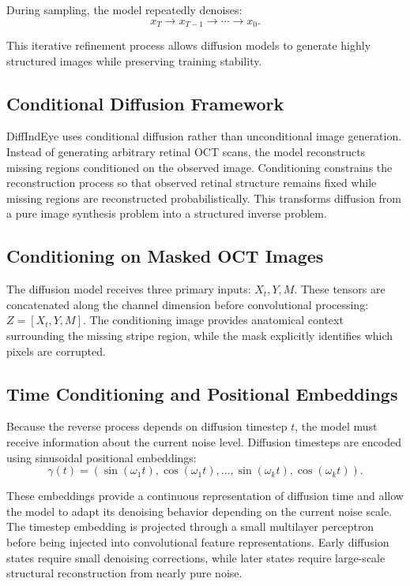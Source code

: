 \documentclass[12pt,oneside]{article}
\begin{document}
During sampling, the model repeatedly denoises:
\[
x_T
\rightarrow
x_{T-1}
\rightarrow
\cdots
\rightarrow
x_0.
\]

This iterative refinement process allows diffusion models to generate highly structured images while preserving training stability.

\subsection{Conditional Diffusion Framework}

DiffIndEye uses conditional diffusion rather than unconditional image generation. Instead of generating arbitrary retinal OCT scans, the model reconstructs missing regions conditioned on the observed image.
Conditioning constrains the reconstruction process so that observed retinal structure remains fixed while missing regions are reconstructed probabilistically.
This transforms diffusion from a pure image synthesis problem into a structured inverse problem.

\subsection*{Conditioning on Masked OCT Images}

The diffusion model receives three primary inputs: $X_t, Y, M$.
These tensors are concatenated along the channel dimension before convolutional processing:
\(
Z
=
[X_t,Y,M].
\)
The conditioning image provides anatomical context surrounding the missing stripe region, while the mask explicitly identifies which pixels are corrupted.

\subsection*{Time Conditioning and Positional Embeddings}

Because the reverse process depends on diffusion timestep $t$, the model must receive information about the current noise level.
Diffusion timesteps are encoded using sinusoidal positional embeddings:
\[
\gamma(t)
=
\left(
\sin(\omega_1 t),
\cos(\omega_1 t),
\ldots,
\sin(\omega_k t),
\cos(\omega_k t)
\right).
\]

These embeddings provide a continuous representation of diffusion time and allow the model to adapt its denoising behavior depending on the current noise scale.
The timestep embedding is projected through a small multilayer perceptron before being injected into convolutional feature representations.
Early diffusion states require small denoising corrections, while later states require large-scale structural reconstruction from nearly pure noise.
\end{document}
